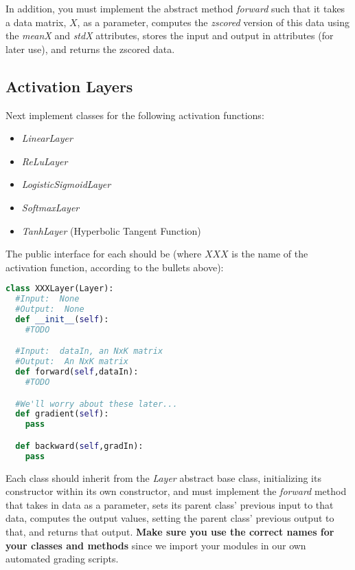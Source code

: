 \documentclass[12pt]{article}
\begin{document}
\noindent
 In addition, you must implement the abstract method \emph{forward} such that it takes a data matrix, $X$, as a parameter, computes the \emph{zscored} version of this data using the \emph{meanX} and \emph{stdX} attributes, stores the input and output in attributes (for later use),  and returns the zscored data.

\newpage
\subsection*{Activation Layers}
Next implement classes for the following activation functions:
\begin{itemize}
\item \emph{LinearLayer}
\item \emph{ReLuLayer}
\item \emph{LogisticSigmoidLayer}
\item \emph{SoftmaxLayer}
\item \emph{TanhLayer} (Hyperbolic Tangent Function)
\end{itemize}

\noindent
The public interface for each should be (where $XXX$ is the name of the activation function, according to the bullets above):
\begin{lstlisting}[language=Python]
class XXXLayer(Layer):
  #Input:  None
  #Output:  None
  def __init__(self):
    #TODO

  #Input:  dataIn, an NxK matrix
  #Output:  An NxK matrix
  def forward(self,dataIn):
    #TODO

  #We'll worry about these later...
  def gradient(self):
    pass

  def backward(self,gradIn):
    pass

\end{lstlisting}

\noindent
Each class should inherit from the \emph{Layer} abstract base class, initializing its constructor within its own constructor, and must implement the \emph{forward} method that takes in data as a parameter, sets its parent class' previous input to that data, computes the output values, setting the parent class' previous output to that, and returns that output.  \textbf{Make sure you use the correct names for your classes and methods} since we import your modules in our own automated grading scripts.

\newpage
\end{document}
